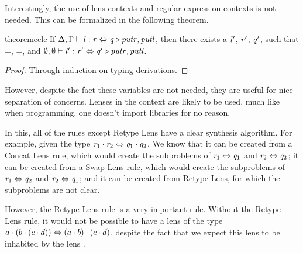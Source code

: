 Interestingly, the use of lens contexts and regular expression contexts
is not needed.
This can be formalized in the following theorem.
\begin{restatable}{theorem}{eclc}
\label{thm:empty-context-lens-completeness}
If $\Delta, \Gamma \vdash \mathit{l} : \mathit{r} \Leftrightarrow \mathit{q} \triangleright \mathit{putr},\mathit{putl}$,
then there exists a $\mathit{l}'$, $\mathit{r}'$, $\mathit{q}'$, such that
\LanguageOf{\RegexContext}{\Regex}=,
\LanguageOf{\RegexContext}{\RegexAlt}=, and
$\emptyset,\emptyset \vdash \mathit{l}' : \mathit{r}' \Leftrightarrow \mathit{q}' \triangleright \mathit{putr},\mathit{putl}$.
\end{restatable}
\begin{proof}
Through induction on typing derivations.
\end{proof}
However, despite the fact these variables are not needed, they are useful for nice
separation of concerns.
Lenses in the context are likely to be used, much like when programming, one
doesn't import libraries for no reason.

In this, all of the rules except Retype Lens have a clear synthesis algorithm.
For example, given the type $\mathit{r}_1\cdot\mathit{r}_2\Leftrightarrow\mathit{q}_1\cdot\mathit{q}_2$.
We know that it can be created from a Concat Lens rule,
which would create the subproblems of $\mathit{r}_1\Leftrightarrow\mathit{q}_1$ and $\mathit{r}_2\Leftrightarrow\mathit{q}_2$;
it can be created from a Swap Lens rule, which would create the subproblems of $\mathit{r}_1\Leftrightarrow\mathit{q}_2$ and $\mathit{r}_2\Leftrightarrow\mathit{q}_1$;
and it can be created from Retype Lens, for which the subproblems are not clear.

However, the Retype Lens rule is a very important rule.
Without the Retype Lens rule, it would not be possible to have a lens of the type
$a\cdot (b\cdot (c\cdot d))\Leftrightarrow(a\cdot b)\cdot(c\cdot d)$,
despite the fact that we expect this lens to be inhabited by the lens \IdentityLens{}.


